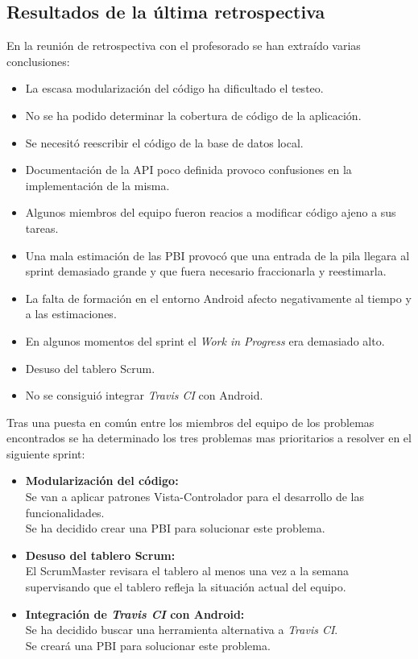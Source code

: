 \documentclass[11pt,a4paper]{report}
\begin{document}
\subsection{Resultados de la última retrospectiva}
En la reunión de retrospectiva con el profesorado se han extraído varias conclusiones:
\begin{itemize}
	\item La escasa modularización del código ha dificultado el testeo.
	\item No se ha podido determinar la cobertura de código de la aplicación.
	\item Se necesitó reescribir el código de la base de datos local.
	\item Documentación de la API poco definida provoco confusiones en la implementación de la misma.
	\item Algunos miembros del equipo fueron reacios a modificar código ajeno a sus tareas.
	\item Una mala estimación de las PBI provocó que una entrada de la pila llegara al sprint demasiado grande y que fuera necesario fraccionarla y reestimarla.
	\item La falta de formación en el entorno Android afecto negativamente al tiempo y a las estimaciones.
	\item En algunos momentos del sprint el \textit{Work in Progress} era demasiado alto.
	\item Desuso del tablero Scrum.
	\item No se consiguió integrar \textit{Travis CI} con Android.
\end{itemize}
Tras una puesta en común entre los miembros del equipo de los problemas encontrados se ha determinado los tres problemas mas prioritarios a resolver en el siguiente sprint:
\begin{itemize}
	\item \textbf{Modularización del código:} 
	\\Se van a aplicar patrones Vista-Controlador para el desarrollo de las funcionalidades.
	\\Se ha decidido crear una PBI para solucionar este problema.
	\item \textbf{Desuso del tablero Scrum:}
	\\El ScrumMaster revisara el tablero al menos una vez a la semana supervisando que el tablero refleja la situación actual del equipo.
	\item \textbf{Integración de \textit{Travis CI} con Android:}
	\\Se ha decidido buscar una herramienta alternativa a \textit{Travis CI}.
	\\Se creará una PBI para solucionar este problema.
\end{itemize}
\end{document}
